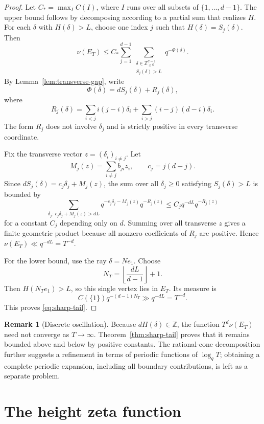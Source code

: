 \documentclass[11pt]{amsart}
\newcommand{\ZZ}{\mathbb Z}
\theoremstyle{plain}
\theoremstyle{definition}
\newtheorem{remark}[theorem]{Remark}
\numberwithin{equation}{section}
\begin{document}
\begin{proof}
Let $C_*=\max_I C(I)$, where $I$ runs over all subsets of $\{1,\ldots,d-1\}$.  The upper
bound follows by decomposing according to a partial sum that realizes $H$.  For each
$\delta$ with $H(\delta)>L$, choose one index $j$ such that $H(\delta)=S_j(\delta)$.  Then
\[
  \nu(E_T)
  \le
  C_*\sum_{j=1}^{d-1}
  \sum_{\substack{\delta\in\ZZ_{\ge0}^{d-1}\\ S_j(\delta)>L}}
  q^{-\Phi(\delta)}.
\]
By Lemma~\ref{lem:transverse-gap}, write
\[
  \Phi(\delta)=dS_j(\delta)+R_j(\delta),
\]
where
\[
  R_j(\delta)=\sum_{i<j}i(j-i)\delta_i+
  \sum_{i>j}(i-j)(d-i)\delta_i.
\]
The form $R_j$ does not involve $\delta_j$ and is strictly positive in every transverse
coordinate.

Fix the transverse vector $z=(\delta_i)_{i\ne j}$.  Let
\[
  M_j(z)=\sum_{i\ne j}b_{ji}z_i,
  \qquad c_j=j(d-j).
\]
Since $dS_j(\delta)=c_j\delta_j+M_j(z)$, the sum over all $\delta_j\ge0$ satisfying
$S_j(\delta)>L$ is bounded by
\[
  \sum_{\delta_j:\,c_j\delta_j+M_j(z)>dL}
  q^{-c_j\delta_j-M_j(z)}q^{-R_j(z)}
  \le C_jq^{-dL}q^{-R_j(z)}
\]
for a constant $C_j$ depending only on $d$.  Summing over all transverse $z$ gives a finite
geometric product because all nonzero coefficients of $R_j$ are positive.  Hence
$\nu(E_T)\ll q^{-dL}=T^{-d}$.

For the lower bound, use the ray $\delta=Ne_1$.  Choose
\[
  N_T=\left\lfloor\frac{dL}{d-1}\right\rfloor+1.
\]
Then $H(N_Te_1)>L$, so this single vertex lies in $E_T$.  Its measure is
\[
  C(\{1\})q^{-(d-1)N_T}\gg q^{-dL}=T^{-d}.
\]
This proves \eqref{eq:sharp-tail}.
\end{proof}

\begin{remark}[Discrete oscillation]
Because $dH(\delta)\in\ZZ$, the function $T^d\nu(E_T)$ need not converge as
$T\to\infty$.  Theorem~\ref{thm:sharp-tail} proves that it remains bounded above and below
by positive constants.  The rational-cone decomposition further suggests a refinement in
terms of periodic functions of $\log_qT$; obtaining a complete periodic expansion, including
all boundary contributions, is left as a separate problem.
\end{remark}

\section{The height zeta function}\label{sec:hzf}
\end{document}
